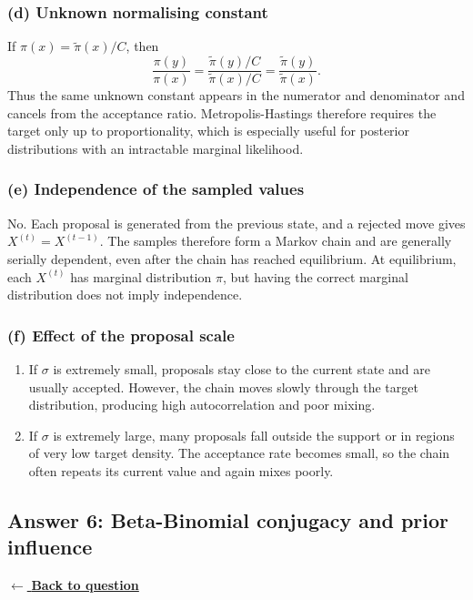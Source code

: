 \documentclass[11pt,a4paper]{article}
\newcommand{\answernav}[1]{%
  \label{answer:#1}%
  \noindent\hyperref[question:#1]{$\leftarrow$ \textbf{Back to question}}%
  \par\smallskip}
\begin{document}
\subsubsection*{(d) Unknown normalising constant}

If $\pi(x)=\widetilde{\pi}(x)/C$, then
\[
  \frac{\pi(y)}{\pi(x)}
  =\frac{\widetilde{\pi}(y)/C}{\widetilde{\pi}(x)/C}
  =\frac{\widetilde{\pi}(y)}{\widetilde{\pi}(x)}.
\]
Thus the same unknown constant appears in the numerator and denominator and
cancels from the acceptance ratio. Metropolis-Hastings therefore requires the
target only up to proportionality, which is especially useful for posterior
distributions with an intractable marginal likelihood.

\subsubsection*{(e) Independence of the sampled values}

No. Each proposal is generated from the previous state, and a rejected move
gives $X^{(t)}=X^{(t-1)}$. The samples therefore form a Markov chain and are
generally serially dependent, even after the chain has reached equilibrium.
At equilibrium, each $X^{(t)}$ has marginal distribution $\pi$, but having
the correct marginal distribution does not imply independence.

\subsubsection*{(f) Effect of the proposal scale}

\begin{enumerate}[label=\arabic*.,leftmargin=*]
  \item If $\sigma$ is extremely small, proposals stay close to the current
        state and are usually accepted. However, the chain moves slowly
        through the target distribution, producing high autocorrelation and
        poor mixing.

  \item If $\sigma$ is extremely large, many proposals fall outside the
        support or in regions of very low target density. The acceptance rate
        becomes small, so the chain often repeats its current value and again
        mixes poorly.
\end{enumerate}

\clearpage

\subsection{Answer 6: Beta-Binomial conjugacy and prior influence}
\answernav{6}
\end{document}
